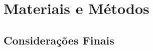 \chapter{Materiais e Métodos}\label{cap:ferramentas}

\lipsum[43-45]

\section{Considerações Finais}

\lipsum[23]
